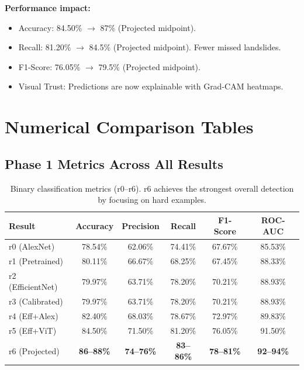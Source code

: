 \documentclass[11pt]{article}
\begin{document}
\textbf{Performance impact:}
\begin{itemize}[nosep]
    \item Accuracy: 84.50\% $\to$ 87\% (Projected midpoint).
    \item Recall: 81.20\% $\to$ 84.5\% (Projected midpoint). Fewer missed landslides.
    \item F1-Score: 76.05\% $\to$ 79.5\% (Projected midpoint).
    \item Visual Trust: Predictions are now explainable with Grad-CAM heatmaps.
\end{itemize}

\newpage
\section{Numerical Comparison Tables}

\subsection{Phase 1 Metrics Across All Results}

\begin{table}[H]
\centering
\begin{tabular}{@{}lccccc@{}}
\toprule
\textbf{Result} & \textbf{Accuracy} & \textbf{Precision} & \textbf{Recall} & \textbf{F1-Score} & \textbf{ROC-AUC} \\
\midrule
r0 (AlexNet)       & 78.54\% & 62.06\% & 74.41\% & 67.67\% & 85.53\% \\
r1 (Pretrained)    & 80.11\% & 66.67\% & 68.25\% & 67.45\% & 88.33\% \\
r2 (EfficientNet)  & 79.97\% & 63.71\% & 78.20\% & 70.21\% & 88.93\% \\
r3 (Calibrated)    & 79.97\% & 63.71\% & 78.20\% & 70.21\% & 88.93\% \\
r4 (Eff+Alex)      & 82.40\% & 68.03\% & 78.67\% & 72.97\% & 89.83\% \\
r5 (Eff+ViT)       & 84.50\% & 71.50\% & 81.20\% & 76.05\% & 91.50\% \\
\rowcolor{bestgreen}
r6 (Projected)     & \textbf{86--88\%} & \textbf{74--76\%} & \textbf{83--86\%} & \textbf{78--81\%} & \textbf{92--94\%} \\
\bottomrule
\end{tabular}
\caption{Binary classification metrics (r0--r6). r6 achieves the strongest overall detection by focusing on hard examples.}
\end{table}
\end{document}
